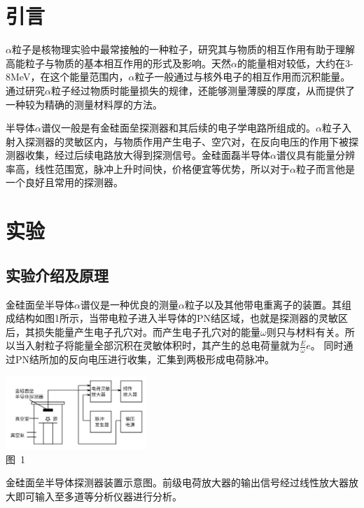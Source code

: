 \documentclass[a4paper,10.0pt,twoside]{npr}
\begin{document}
\begin{multicols}{2}

\section{引言}    %
\vspace*{-1mm}
\song\wuhao
$\alpha$粒子是核物理实验中最常接触的一种粒子，研究其与物质的相互作用有助于理解高能粒子与物质的基本相互作用的形式及影响。天然$\alpha$的能量相对较低，大约在3-8MeV，在这个能量范围内，$\alpha$粒子一般通过与核外电子的相互作用而沉积能量。通过研究$\alpha$粒子经过物质时能量损失的规律，还能够测量薄膜的厚度，从而提供了一种较为精确的测量材料厚的方法。

半导体$\alpha$谱仪一般是有金硅面垒探测器和其后续的电子学电路所组成的。$\alpha$粒子入射入探测器的灵敏区内，与物质作用产生电子、空穴对，在反向电压的作用下被探测器收集，经过后续电路放大得到探测信号。金硅面磊半导体$\alpha$谱仪具有能量分辨率高，线性范围宽，脉冲上升时间快，价格便宜等优势，所以对于$\alpha$粒子而言他是一个良好且常用的探测器。

\section{实验}
\subsection{实验介绍及原理}
金硅面垒半导体$\alpha$谱仪是一种优良的测量$\alpha$粒子以及其他带电重离子的装置。其组成结构如图1所示，当带电粒子进入半导体的PN结区域，也就是探测器的灵敏区后，其损失能量产生电子孔穴对。而产生电子孔穴对的能量$\omega$则只与材料有关。所以当入射粒子将能量全部沉积在灵敏体积时，其产生的总电荷量就为$\frac{E}{\omega} e$。 同时通过PN结所加的反向电压进行收集，汇集到两极形成电荷脉冲。

\begin{center}
\includegraphics[width=0.4\textwidth]{tu1.png}\\
\xiaowu\song 图~1\begin{minipage}[t]{75mm} \quad 金硅面垒半导体探测器装置示意图。前级电荷放大器的输出信号经过线性放大器放大即可输入至多道等分析仪器进行分析。\\[-1mm]\wuhao
\end{minipage}
\end{center}


\end{multicols}
\end{document}
